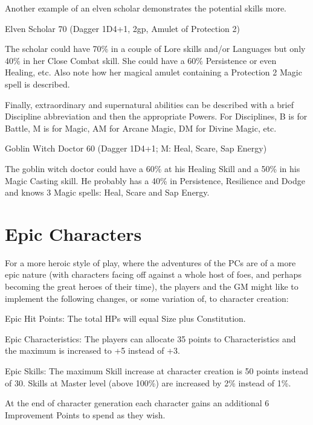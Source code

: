 Another example of an elven scholar demonstrates the potential skills more.

\vspace{1em}
\begin{rpg-examplebox}
Elven Scholar 70 (Dagger 1D4+1, 2gp, Amulet of Protection 2)
\end{rpg-examplebox}

The scholar could have 70\% in a couple of Lore skills and/or Languages but only 40\% in her Close Combat skill. She could have a 60\% Persistence or even Healing, etc.
Also note how her magical amulet containing a Protection 2 Magic spell is described.

Finally, extraordinary and supernatural abilities can be described with a brief Discipline abbreviation and then the appropriate Powers. For Disciplines, B is for Battle, M is for Magic, AM for Arcane Magic, DM for Divine Magic, etc.

\vspace{1em}
\begin{rpg-examplebox}
Goblin Witch Doctor 60 (Dagger 1D4+1; M: Heal, Scare, Sap Energy)
\end{rpg-examplebox}

The goblin witch doctor could have a 60\% at his Healing Skill and a 50\% in his Magic Casting skill. He probably has a 40\% in Persistence, Resilience and Dodge and knows 3 Magic spells: Heal, Scare and Sap Energy.


\section{Epic Characters}
For a more heroic style of play, where the adventures of the PCs are of a more epic nature (with characters facing off against a whole host of foes, and perhaps becoming the great heroes of their time), the players and the GM might like to implement the following changes, or some variation of, to character creation:

\begin{rpg-list}
	\item Epic Hit Points: The total HPs will equal Size plus Constitution.
	\item Epic Characteristics: The players can allocate 35 points to Characteristics and the maximum is increased to +5 instead of +3.
	\item Epic Skills: The maximum Skill increase at character creation is 50 points instead of 30. Skills at Master level (above 100\%) are increased by 2\% instead of 1\%.
	\item At the end of character generation each character gains an additional 6 Improvement Points to spend as they wish.
\end{rpg-list}


